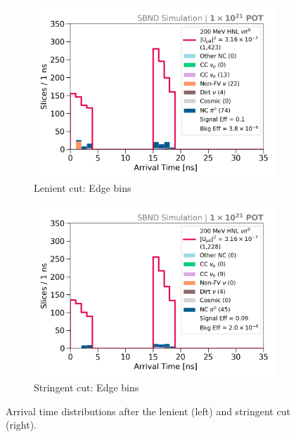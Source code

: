 \begin{figure}[bp!]
\begin{subfigure}[b]{0.495\textwidth}
            \centering 
	    \includegraphics[width=\textwidth]{bb_lenient_edge}
            \caption{Lenient cut: Edge bins}%
	    \label{fig:bb_edge_loose}
        \end{subfigure}
        \hfill
        \begin{subfigure}[b]{0.495\textwidth}   
            \centering 
	    \includegraphics[width=\textwidth]{bb_stringent_edge}
            \caption{Stringent cut: Edge bins}%
	    \label{fig:bb_edge_strict}
        \end{subfigure}
	\caption[Arrival Time Distributions After Selection]{
	Arrival time distributions after the lenient (left) and stringent cut (right).
	}
        \label{fig:timing_cut}

\end{figure}
